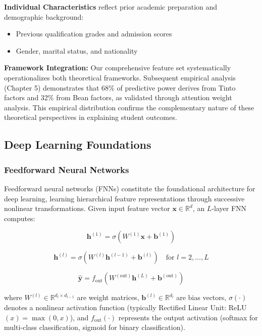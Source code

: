 \textbf{Individual Characteristics} reflect prior academic preparation and demographic background:
\begin{itemize}
\item Previous qualification grades and admission scores
\item Gender, marital status, and nationality
\end{itemize}

\textbf{Framework Integration:} Our comprehensive feature set systematically operationalizes both theoretical frameworks. Subsequent empirical analysis (Chapter 5) demonstrates that 68\% of predictive power derives from Tinto factors and 32\% from Bean factors, as validated through attention weight analysis. This empirical distribution confirms the complementary nature of these theoretical perspectives in explaining student outcomes.

\subsection{Deep Learning Foundations}

\subsubsection{Feedforward Neural Networks}

Feedforward neural networks (FNNs) constitute the foundational architecture for deep learning, learning hierarchical feature representations through successive nonlinear transformations. Given input feature vector $\mathbf{x} \in \mathbb{R}^d$, an $L$-layer FNN computes:

\begin{equation}
\mathbf{h}^{(1)} = \sigma\left(W^{(1)}\mathbf{x} + \mathbf{b}^{(1)}\right)
\end{equation}

\begin{equation}
\mathbf{h}^{(l)} = \sigma\left(W^{(l)}\mathbf{h}^{(l-1)} + \mathbf{b}^{(l)}\right) \quad \text{for } l = 2, \ldots, L
\end{equation}

\begin{equation}
\hat{\mathbf{y}} = f_{\text{out}}\left(W^{(\text{out})}\mathbf{h}^{(L)} + \mathbf{b}^{(\text{out})}\right)
\end{equation}

where $W^{(l)} \in \mathbb{R}^{d_{l} \times d_{l-1}}$ are weight matrices, $\mathbf{b}^{(l)} \in \mathbb{R}^{d_l}$ are bias vectors, $\sigma(\cdot)$ denotes a nonlinear activation function (typically Rectified Linear Unit: ReLU$(x) = \max(0, x)$), and $f_{\text{out}}(\cdot)$ represents the output activation (softmax for multi-class classification, sigmoid for binary classification).

